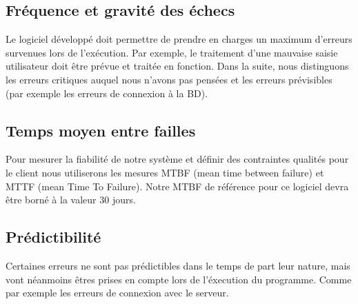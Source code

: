 	 
	
	
		\subsection{Fréquence et gravité des échecs}
	
		Le logiciel développé doit permettre de prendre en charges un maximum d'erreurs survenues lors de l'exécution. Par exemple, le traitement d'une mauvaise saisie utilisateur doit être prévue et traitée en fonction.
		\medskip
		Dans la suite, nous distinguons les erreurs critiques auquel nous n'avons pas pensées et les erreurs prévisibles (par exemple les erreurs de connexion à la BD).
		
		\subsection{Temps moyen entre failles}
		Pour mesurer la fiabilité de notre système et définir des contraintes qualités pour le client nous utiliserons les mesures MTBF (mean time between failure) et MTTF (mean Time To Failure). Notre MTBF de référence pour ce logiciel devra être borné à la valeur 30 jours.

		
		
		\subsection{Prédictibilité}
		Certaines erreurs ne sont pas prédictibles dans le temps de part leur nature, mais vont néanmoins êtres prises en compte lors de l'éxecution du programme. Comme par exemple les erreurs de connexion avec le serveur. 
		
